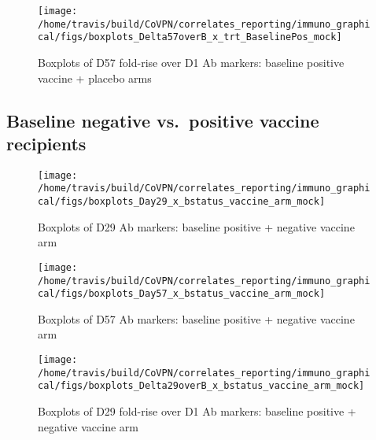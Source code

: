 \documentclass[]{book}
\theoremstyle{definition}
\theoremstyle{definition}
\theoremstyle{definition}
\newcommand{\1}{\mathbbm{1}}
\begin{document}
\clearpage
\begin{figure}[H]

{\centering \texttt{[image: /home/travis/build/CoVPN/correlates\_reporting/immuno\_graphical/figs/boxplots\_Delta57overB\_x\_trt\_BaselinePos\_mock]} 

}

\caption{Boxplots of D57 fold-rise over D1 Ab markers: baseline positive vaccine + placebo arms}\label{fig:unnamed-chunk-44}
\end{figure}

\clearpage

\hypertarget{baseline-negative-vs.positive-vaccine-recipients}{%
\subsection{Baseline negative vs.~positive vaccine recipients}\label{baseline-negative-vs.positive-vaccine-recipients}}

\begin{figure}[H]

{\centering \texttt{[image: /home/travis/build/CoVPN/correlates\_reporting/immuno\_graphical/figs/boxplots\_Day29\_x\_bstatus\_vaccine\_arm\_mock]} 

}

\caption{Boxplots of D29 Ab markers: baseline positive + negative vaccine arm}\label{fig:unnamed-chunk-45}
\end{figure}

\clearpage
\begin{figure}[H]

{\centering \texttt{[image: /home/travis/build/CoVPN/correlates\_reporting/immuno\_graphical/figs/boxplots\_Day57\_x\_bstatus\_vaccine\_arm\_mock]} 

}

\caption{Boxplots of D57 Ab markers: baseline positive + negative vaccine arm}\label{fig:unnamed-chunk-46}
\end{figure}

\clearpage
\begin{figure}[H]

{\centering \texttt{[image: /home/travis/build/CoVPN/correlates\_reporting/immuno\_graphical/figs/boxplots\_Delta29overB\_x\_bstatus\_vaccine\_arm\_mock]} 

}

\caption{Boxplots of D29 fold-rise over D1 Ab markers: baseline positive + negative vaccine arm}\label{fig:unnamed-chunk-47}
\end{figure}
\end{document}
